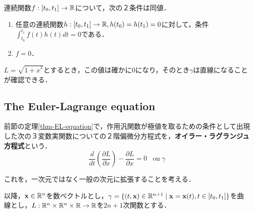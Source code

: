 \documentclass[uplatex,dvipdfmx]{jsreport}
\begin{document}
\begin{lemma}
    連続関数$f:[t_0,t_1]\to\mathbb{R}$について，次の２条件は同値．
    \begin{enumerate}
        \item 任意の連続関数$h:[t_0,t_1]\to\mathbb{R}, h(t_0)=h(t_1)=0$に対して，条件$\int^{t_1}_{t_0}f(t)h(t)dt=0$である．
        \item $f=0$．
    \end{enumerate}
\end{lemma}

\begin{example}
    $L=\sqrt{1+\dot{x}^2}$とするとき，この値は確かに$0$になり，そのとき$\gamma$は直線になることが確認できる．
\end{example}

\subsection{The Euler-Lagrange equation}

\begin{definition}
    前節の定理\ref{thm-EL-equation}で，作用汎関数が極値を取るための条件として出現した次の３変数実関数についての２階偏微分方程式を，\textbf{オイラー・ラグランジュ方程式}という．
    \[ \frac{d}{dt}\left(\frac{\partial L}{\partial\dot{x}}\right) - \frac{\partial L}{\partial x} = 0\;\;\;\mathrm{on\;}\gamma \]
\end{definition}

これを，一次元ではなく一般の次元に拡張することを考える．
\begin{notation}
    以降，$\mathbf{x}\in\mathbb{R}^n$を数ベクトルとし，$\gamma=\{(t,\mathbf{x})\in\mathbb{R}^{n+1}\mid \mathbf{x}=\mathbf{x}(t),t\in[t_0,t_1]\}$を曲線とし，$L:\mathbb{R}^n\times\mathbb{R}^n\times\mathbb{R}\to\mathbb{R}$を$2n+1$次関数とする．
\end{notation}
\end{document}

